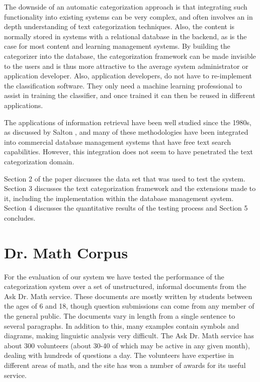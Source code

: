 \documentclass[twocolumn]{article}
\begin{document}
The downside of an automatic categorization approach is that integrating such 
functionality into existing systems can be very complex, and often involves an in 
depth understanding of text categorization techniques.  Also, the content is normally 
stored in systems with a relational database in the backend, as is the case for most 
content and learning management systems. By building the categorizer into the 
database, the categorization framework\cite{williams:02} can be made invisible to the 
users and is thus more attractive to the average system administrator or application 
developer. Also, application developers, do not have to re-implement the 
classification software. They only need a machine learning professional to assist in 
training the classifier, and once trained it can then be reused in different applications. 

The applications of information retrieval have been well studied since the 1980s, as 
discussed by Salton \cite{salton:89,salton:91}, and many of these methodologies have been 
integrated into commercial database management systems that have free text search 
capabilities. However, this integration does not seem to have penetrated the text 
categorization domain.

Section 2 of the paper discusses the data set that was used to test
the system. Section 3 discusses the text categorization framework and
the extensions made to it, including the implementation within the
database management system. Section 4 discusses the quantitative
results of the testing process and Section 5 concludes.

\section{Dr. Math Corpus}

For the evaluation of our system we have tested the performance of the
categorization system over a set of unstructured, informal documents
from the Ask Dr. Math service.\cite{drmath} These documents are mostly
written by students between the ages of 6 and 18, though question
submissions can come from any member of the general public.  The documents vary
in length from a single sentence to several paragraphs. In addition to
this, many examples contain symbols and diagrams, making linguistic
analysis very difficult. The Ask Dr. Math service has about 300
volunteers (about 30-40 of which may be active in any given month),
dealing with hundreds of questions a day. The volunteers have
expertise in different areas of math, and the site has won a number of
awards for its useful service.
\end{document}
